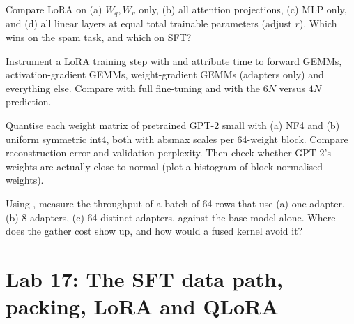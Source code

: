 \begin{exercise}
Compare LoRA on (a) $W_q,W_v$ only, (b) all attention projections, (c) MLP only, and
(d) all linear layers at equal total trainable parameters (adjust $r$). Which wins on
the spam task, and which on SFT?
\end{exercise}

\begin{exercise}
Instrument a LoRA training step with  and attribute time to
forward GEMMs, activation-gradient GEMMs, weight-gradient GEMMs (adapters only) and
everything else. Compare with full fine-tuning and with the $6N$ versus $4N$
prediction.
\end{exercise}

\begin{exercise}
Quantise each weight matrix of pretrained GPT-2 small with (a) NF4 and (b) uniform
symmetric int4, both with absmax scales per 64-weight block. Compare reconstruction
error and validation perplexity. Then check whether GPT-2's weights are actually close
to normal (plot a histogram of block-normalised weights).
\end{exercise}

\begin{exercise}
Using , measure the throughput of a batch of 64 rows that use
(a) one adapter, (b) 8 adapters, (c) 64 distinct adapters, against the base model alone.
Where does the gather cost show up, and how would a fused kernel avoid it?
\end{exercise}

\section{Lab 17: The SFT data path, packing, LoRA and QLoRA}\label{sec:instruct:lab}

